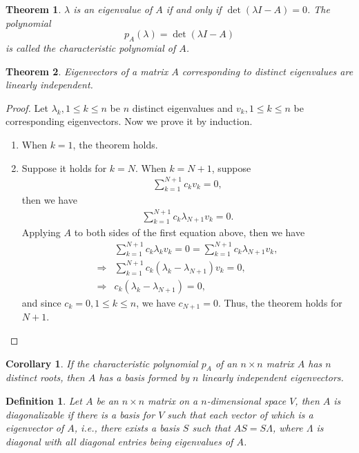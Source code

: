 \documentclass[11pt]{book}
\newtheorem{definition}{Definition}[chapter]
\newtheorem{theorem}{Theorem}[chapter]
\newtheorem{corollary}{Corollary}[theorem]
\theoremstyle{definition}
\numberwithin{equation}{chapter}
\begin{document}
\medskip

\begin{theorem}
$\lambda$ is an eigenvalue of $A$ if and only if $\det (\lambda I-A) = 0$. The polynomial
$$p_A(\lambda) = \det (\lambda I-A)$$
is called the characteristic polynomial of $A$.
\end{theorem}

\medskip

\begin{theorem}
Eigenvectors of a matrix $A$ corresponding to distinct eigenvalues
are linearly independent.
\end{theorem}
\begin{proof}
Let $\lambda_k, 1\leq k \leq n$ be $n$ distinct eigenvalues and $v_k, 1\leq k \leq n$ be corresponding eigenvectors. Now we prove it by induction.
\begin{enumerate}[label=(\alph*)]
    \item When $k = 1$, the theorem holds.
    \item Suppose it holds for $k = N$. When $k = N+1$, suppose 
    \begin{align*}
        \sum^{N+1}_{k=1}c_k v_k = 0,
    \end{align*}
    then we have
    \begin{align*}
        \sum^{N+1}_{k=1}c_k \lambda_{N+1} v_k = 0.
    \end{align*}
    Applying $A$ to both sides of the first equation above, then we have
    \begin{align*}
        & \sum^{N+1}_{k=1}c_k \lambda_k v_k = 0 = \sum^{N+1}_{k=1}c_k \lambda_{N+1} v_k, \\
        \Rightarrow & \sum^{N+1}_{k=1}c_k (\lambda_k  - \lambda_{N+1}) v_k = 0, \\
        \Rightarrow & c_k (\lambda_k  - \lambda_{N+1}) = 0,
    \end{align*}
    and since $c_k = 0, 1\leq k\leq n$, we have $c_{N+1} = 0$. Thus, the theorem holds for $N+1$. 
\end{enumerate}
\end{proof}

\medskip

\begin{corollary}
If the characteristic polynomial $p_A$ of an $n\times n$ matrix $A$ has $n$ distinct roots, then $A$ has a basis formed by $n$ linearly independent eigenvectors.
\end{corollary}

\medskip

\begin{definition}{\rm \cite{27}}
Let $A$ be an $n \times n$ matrix on a $n$-dimensional space $V$, then $A$ is diagonalizable if there is a basis for $V$ such that each vector of which is a eigenvector of $A$, i.e., there exists a basis $S$ such that $AS = S\Lambda$, where $\Lambda$ is diagonal with all diagonal entries being eigenvalues of $A$.
\end{definition}
\end{document}
